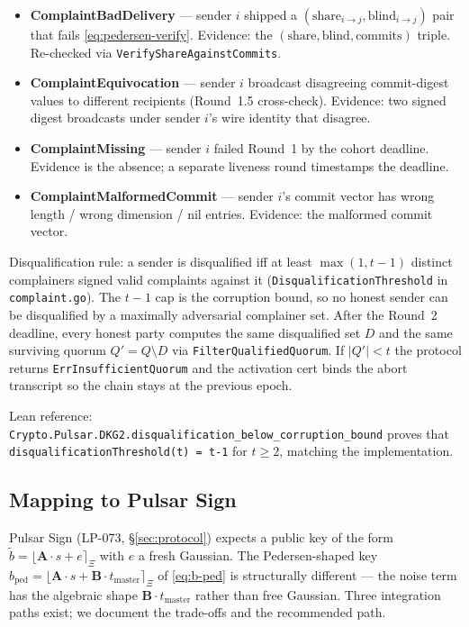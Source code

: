 \begin{itemize}[leftmargin=2em,nosep]
\item \textbf{ComplaintBadDelivery} --- sender $i$ shipped a
$(\text{share}_{i\to j},\text{blind}_{i\to j})$ pair that fails
\eqref{eq:pedersen-verify}. Evidence: the $(\text{share},\text{blind},
\text{commits})$ triple. Re-checked via
\texttt{VerifyShareAgainstCommits}.
\item \textbf{ComplaintEquivocation} --- sender $i$ broadcast disagreeing
commit-digest values to different recipients (Round~1.5 cross-check).
Evidence: two signed digest broadcasts under sender $i$'s wire
identity that disagree.
\item \textbf{ComplaintMissing} --- sender $i$ failed Round~1 by the
cohort deadline. Evidence is the absence; a separate liveness round
timestamps the deadline.
\item \textbf{ComplaintMalformedCommit} --- sender $i$'s commit vector
has wrong length / wrong dimension / nil entries. Evidence: the
malformed commit vector.
\end{itemize}

Disqualification rule: a sender is disqualified iff at least
$\max(1, t-1)$ distinct complainers signed valid complaints against it
(\texttt{DisqualificationThreshold} in \texttt{complaint.go}). The
$t-1$ cap is the corruption bound, so no honest sender can be
disqualified by a maximally adversarial complainer set. After the
Round~2 deadline, every honest party computes the same disqualified set
$D$ and the same surviving quorum $Q'=Q\setminus D$ via
\texttt{FilterQualifiedQuorum}. If $|Q'| < t$ the protocol returns
\texttt{ErrInsufficientQuorum} and the activation cert binds the abort
transcript so the chain stays at the previous epoch.

Lean reference:
\texttt{Crypto.Pulsar.DKG2.disqualification\_below\_corruption\_bound}
proves that \texttt{disqualificationThreshold(t) = t-1} for $t\ge 2$,
matching the implementation.

\subsection{Mapping to Pulsar Sign}
\label{ssec:pedersen-sign-integration}

Pulsar Sign (LP-073, \S\ref{sec:protocol}) expects a public key of the
form $\tilde b = \lfloor\mathbf{A}\cdot s + e\rceil_\Xi$ with $e$ a
fresh Gaussian. The Pedersen-shaped key
$b_{\mathrm{ped}} = \lfloor\mathbf{A}\cdot s + \mathbf{B}\cdot t_{\mathrm{master}}\rceil_\Xi$
of \eqref{eq:b-ped} is structurally different --- the noise term has the
algebraic shape $\mathbf{B}\cdot t_{\mathrm{master}}$ rather than free
Gaussian. Three integration paths exist; we document the trade-offs
and the recommended path.

